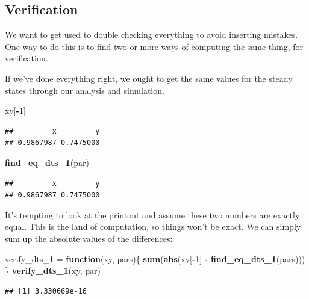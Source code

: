 \documentclass[
]{book}
\newenvironment{Shaded}{\begin{snugshade}}{\end{snugshade}}
\newcommand{\ControlFlowTok}[1]{\textcolor[rgb]{0.13,0.29,0.53}{\textbf{#1}}}
\newcommand{\DecValTok}[1]{\textcolor[rgb]{0.00,0.00,0.81}{#1}}
\newcommand{\FunctionTok}[1]{\textcolor[rgb]{0.13,0.29,0.53}{\textbf{#1}}}
\newcommand{\NormalTok}[1]{#1}
\newcommand{\OtherTok}[1]{\textcolor[rgb]{0.56,0.35,0.01}{#1}}
\newcommand{\SpecialCharTok}[1]{\textcolor[rgb]{0.81,0.36,0.00}{\textbf{#1}}}
\begin{document}
\subsection{Verification}\label{verification}

We want to get used to double checking everything to avoid inserting mistakes. One way to do this is to find two or more ways of computing the same thing, for verification.

If we've done everything right, we ought to get the same values for the steady states through our analysis and simulation.

\begin{Shaded}
\begin{Highlighting}[]
\NormalTok{xy[}\SpecialCharTok{{-}}\DecValTok{1}\NormalTok{]}
\end{Highlighting}
\end{Shaded}

\begin{verbatim}
##         x         y 
## 0.9867987 0.7475000
\end{verbatim}

\begin{Shaded}
\begin{Highlighting}[]
\FunctionTok{find\_eq\_dts\_1}\NormalTok{(par) }
\end{Highlighting}
\end{Shaded}

\begin{verbatim}
##         x         y 
## 0.9867987 0.7475000
\end{verbatim}

It's tempting to look at the printout and assume these two numbers are exactly equal. This is the land of computation, so things won't be exact. We can simply sum up the absolute values of the differences:

\begin{Shaded}
\begin{Highlighting}[]
\NormalTok{verify\_dts\_1 }\OtherTok{=} \ControlFlowTok{function}\NormalTok{(xy, pars)\{}
  \FunctionTok{sum}\NormalTok{(}\FunctionTok{abs}\NormalTok{(xy[}\SpecialCharTok{{-}}\DecValTok{1}\NormalTok{] }\SpecialCharTok{{-}} \FunctionTok{find\_eq\_dts\_1}\NormalTok{(pars))) }
\NormalTok{\}}
\FunctionTok{verify\_dts\_1}\NormalTok{(xy, par)}
\end{Highlighting}
\end{Shaded}

\begin{verbatim}
## [1] 3.330669e-16
\end{verbatim}
\end{document}
